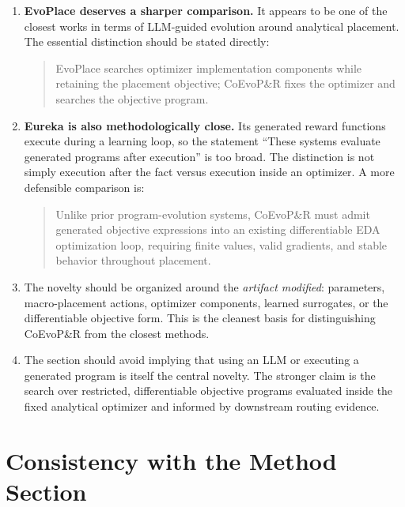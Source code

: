 \documentclass[11pt]{article}
\begin{document}
\begin{enumerate}
  \item \textbf{EvoPlace deserves a sharper comparison.} It appears to be one
  of the closest works in terms of LLM-guided evolution around analytical
  placement. The essential distinction should be stated directly:

  \begin{quote}
  EvoPlace searches optimizer implementation components while retaining the
  placement objective; CoEvoP\&R fixes the optimizer and searches the objective
  program.
  \end{quote}

  \item \textbf{Eureka is also methodologically close.} Its generated reward
  functions execute during a learning loop, so the statement ``These systems
  evaluate generated programs after execution'' is too broad. The distinction
  is not simply execution after the fact versus execution inside an optimizer.
  A more defensible comparison is:

  \begin{quote}
  Unlike prior program-evolution systems, CoEvoP\&R must admit generated
  objective expressions into an existing differentiable EDA optimization loop,
  requiring finite values, valid gradients, and stable behavior throughout
  placement.
  \end{quote}

  \item The novelty should be organized around the \emph{artifact modified}:
  parameters, macro-placement actions, optimizer components, learned
  surrogates, or the differentiable objective form. This is the cleanest basis
  for distinguishing CoEvoP\&R from the closest methods.

  \item The section should avoid implying that using an LLM or executing a
  generated program is itself the central novelty. The stronger claim is the
  search over restricted, differentiable objective programs evaluated inside
  the fixed analytical optimizer and informed by downstream routing evidence.
\end{enumerate}

\section{Consistency with the Method Section}
\end{document}
